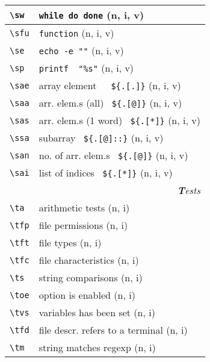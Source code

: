 \documentclass[oneside,11pt,landscape,DIV16]{scrartcl}
\begin{document}
\begin{multicols}{3}
\begin{center}
\begin{tabular}[]{|p{11mm}|p{60mm}|}
\hline \verb'\sw'  & \verb'while do done'                  \hfill (n, i, v)\\
\hline \verb'\sfu' & \verb'function'                       \hfill (n, i, v)\\
%
\hline \verb'\se'  & \verb'echo -e ""'                     \hfill (n, i, v)\\
\hline \verb'\sp'  & \verb'printf  "%s"'                   \hfill (n, i, v)\\
%
\hline \verb'\sae' & array element\ \ \ \verb'${.[.]}'     \hfill (n, i, v)\\
\hline \verb'\saa' & arr. elem.s (all) \ \verb'${.[@]}'    \hfill (n, i, v)\\
\hline \verb'\sas' & arr. elem.s (1 word) \ \verb'${.[*]}' \hfill (n, i, v)\\
\hline \verb'\ssa' & subarray \ \verb'${.[@]::}'           \hfill (n, i, v)\\
\hline \verb'\san' & no. of arr. elem.s \ \verb'${.[@]}'   \hfill (n, i, v)\\
\hline \verb'\sai' & list of indices \ \verb'${.[*]}'      \hfill (n, i, v)\\
\hline
\hline
\multicolumn{2}{|r|}{\textsl{\textbf{T}ests}}                 \\[1.0ex]
\hline \verb'\ta'  & arithmetic tests                  \hfill (n, i)\\
\hline \verb'\tfp' & file permissions                  \hfill (n, i)\\
\hline \verb'\tft' & file types                        \hfill (n, i)\\
\hline \verb'\tfc' & file characteristics              \hfill (n, i)\\
\hline \verb'\ts'  & string comparisons                \hfill (n, i)\\
\hline \verb'\toe' & option is enabled                 \hfill (n, i)\\
\hline \verb'\tvs' & variables has been set            \hfill (n, i)\\
\hline \verb'\tfd' & file descr.  refers to a terminal \hfill (n, i)\\
\hline \verb'\tm'  & string matches regexp             \hfill (n, i)\\
\hline
\end{tabular}\\

\end{center}
\end{multicols}
\end{document}
